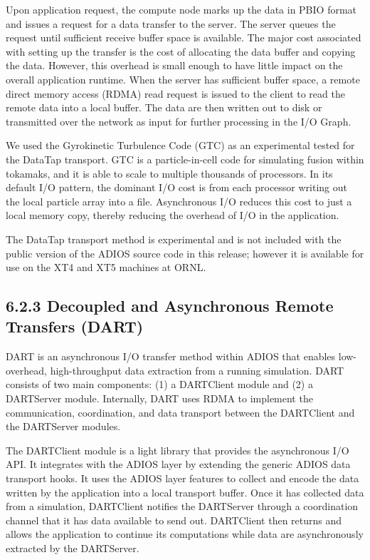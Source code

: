 Upon application request, the compute node marks up the data in PBIO format and 
issues a request for a data transfer to the server. The server queues the request 
until sufficient receive buffer space is available. The major cost associated with 
setting up the transfer is the cost of allocating the data buffer and copying the 
data. However, this overhead is small enough to have little impact on the overall 
application runtime. When the server has sufficient buffer space, a remote direct 
memory access (RDMA) read request is issued to the client to read the remote data 
into a local buffer. The data are then written out to disk or transmitted over 
the network as input for further processing in the I/O Graph. 

We used the Gyrokinetic Turbulence Code (GTC) as an experimental tested for the 
DataTap transport. GTC is a particle-in-cell code for simulating fusion within 
tokamaks, and it is able to scale to multiple thousands of processors. In its default 
I/O pattern, the dominant I/O cost is from each processor writing out the local 
particle array into a file. Asynchronous I/O reduces this cost to just a local 
memory copy, thereby reducing the overhead of I/O in the application.

The DataTap transport method is experimental and is not included with the public 
version of the ADIOS source code in this release; however it is available for use 
on the XT4 and XT5 machines at ORNL.\label{HToc84890267}\label{HToc212016643}\label{HToc212016885}\label{HToc182553392}

\subsection*{{\large {\color{color01} \textbf{6.2.3 Decoupled and Asynchronous 
Remote Transfers}}}{\large \textbf{ (DART)}}}

DART is an asynchronous I/O transfer method within ADIOS that enables low-overhead, 
high-throughput data extraction from a running simulation. DART consists of two 
main components: (1) a DARTClient module and (2) a DARTServer module. Internally, 
DART uses RDMA to implement the communication, coordination, and data transport 
between the DARTClient and the DARTServer modules.

The DARTClient module is a light library that provides the asynchronous I/O API. 
It integrates with the ADIOS layer by extending the generic ADIOS data transport 
hooks. It uses the ADIOS layer features to collect and encode the data written 
by the application into a local transport buffer. Once it has collected data from 
a simulation, DARTClient notifies the DARTServer through a coordination channel 
that it has data available to send out. DARTClient then returns and allows the 
application to continue its computations while data are asynchronously extracted 
by the DARTServer.

